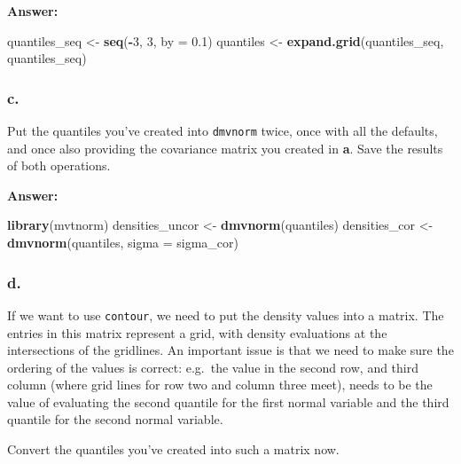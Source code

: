 \documentclass[]{article}
\newenvironment{Shaded}{\begin{snugshade}}{\end{snugshade}}
\newcommand{\DataTypeTok}[1]{\textcolor[rgb]{0.13,0.29,0.53}{#1}}
\newcommand{\DecValTok}[1]{\textcolor[rgb]{0.00,0.00,0.81}{#1}}
\newcommand{\FloatTok}[1]{\textcolor[rgb]{0.00,0.00,0.81}{#1}}
\newcommand{\KeywordTok}[1]{\textcolor[rgb]{0.13,0.29,0.53}{\textbf{#1}}}
\newcommand{\NormalTok}[1]{#1}
\newcommand{\OperatorTok}[1]{\textcolor[rgb]{0.81,0.36,0.00}{\textbf{#1}}}
\newcommand{\StringTok}[1]{\textcolor[rgb]{0.31,0.60,0.02}{#1}}
\begin{document}
\textbf{Answer:}

\begin{Shaded}
\begin{Highlighting}[]
\NormalTok{quantiles_seq <-}\StringTok{ }\KeywordTok{seq}\NormalTok{(}\OperatorTok{-}\DecValTok{3}\NormalTok{, }\DecValTok{3}\NormalTok{, }\DataTypeTok{by =} \FloatTok{0.1}\NormalTok{)}
\NormalTok{quantiles <-}\StringTok{ }\KeywordTok{expand.grid}\NormalTok{(quantiles_seq, quantiles_seq)}
\end{Highlighting}
\end{Shaded}

\hypertarget{c.}{%
\subsubsection{c.}\label{c.}}

Put the quantiles you've created into \texttt{dmvnorm} twice, once with
all the defaults, and once also providing the covariance matrix you
created in \textbf{a}. Save the results of both operations.

\textbf{Answer:}

\begin{Shaded}
\begin{Highlighting}[]
\KeywordTok{library}\NormalTok{(mvtnorm)}
\NormalTok{densities_uncor <-}\StringTok{ }\KeywordTok{dmvnorm}\NormalTok{(quantiles)}
\NormalTok{densities_cor <-}\StringTok{ }\KeywordTok{dmvnorm}\NormalTok{(quantiles, }\DataTypeTok{sigma =}\NormalTok{ sigma_cor)}
\end{Highlighting}
\end{Shaded}

\hypertarget{d.}{%
\subsubsection{d.}\label{d.}}

If we want to use \texttt{contour}, we need to put the density values
into a matrix. The entries in this matrix represent a grid, with density
evaluations at the intersections of the gridlines. An important issue is
that we need to make sure the ordering of the values is correct:
e.g.~the value in the second row, and third column (where grid lines for
row two and column three meet), needs to be the value of evaluating the
second quantile for the first normal variable and the third quantile for
the second normal variable.

Convert the quantiles you've created into such a matrix now.
\end{document}

